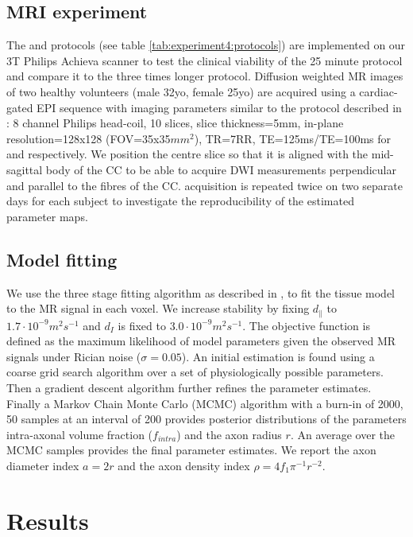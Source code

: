 \subsection{MRI experiment}
The \SFshort{} and \OIlong{} protocols (see table \ref{tab:experiment4:protocols}) are implemented on our 3T Philips Achieva scanner to test the clinical viability of the 25 minute \SFshort{} protocol and compare it to the three times longer \OIlong{} protocol. Diffusion weighted MR images of two healthy volunteers (male 32yo, female 25yo) are acquired using a cardiac-gated EPI sequence with imaging parameters similar to the protocol described in \citep{Alexander:2010}: 8 channel Philips head-coil, 10 slices, slice thickness=5mm, in-plane resolution=128x128 (FOV=35x35$mm^2$), TR=7RR, TE=125ms/TE=100ms for \SFshort{} and \OIlong{} respectively. We position the centre slice so that it is aligned with the mid-sagittal body of the \gls{CC} to be able to acquire DWI measurements perpendicular and parallel to the fibres of the \gls{CC}. \SFshort{} acquisition is repeated twice on two separate days for each subject to investigate the reproducibility of the estimated parameter maps.
%
\subsection{Model fitting}
We use the three stage fitting algorithm as described in \citet{Alexander:2010}, to fit the tissue model to the  MR signal in each voxel. We increase stability by fixing $d_\parallel$ to $1.7\cdot 10^{-9} m^2s^{-1}$ and $d_I$ is fixed to $3.0\cdot 10^{-9} m^2s^{-1}$\citep{Assaf:2008,Barazany:2009,Alexander:2010}. The objective function is defined as the maximum likelihood of model parameters given the observed MR signals under Rician noise ($\sigma=0.05$). An initial estimation is found using a coarse grid search algorithm over a set of physiologically possible parameters. Then a gradient descent algorithm further refines the parameter estimates. Finally a Markov Chain Monte Carlo (MCMC) algorithm with a burn-in of 2000, 50 samples at an interval of 200 provides posterior distributions of the parameters intra-axonal volume fraction ($f_{intra}$) and the axon radius $r$. An average over the MCMC samples provides the final parameter estimates. We report the axon diameter index $a=2r$ and the axon density index $\rho=4f_1\pi^{-1}r^{-2}$.
\section{Results}
